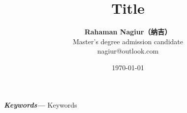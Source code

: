\documentclass[12pt]{article}
\providecommand{\keywords}[1]
{
  \small	
  \textbf{\textit{Keywords---}} #1
}
\begin{document}
\titleformat{\title}[block]{\Large\bfseries}{\thetitle}{1em}{}
\titlespacing*{\title}{60pt}{50pt}{\fill} 

\title{Title\\
\large\textit{}} 

\begin{CJK*}{UTF8}{gbsn}
\author{\textbf{Rahaman Nagiur（纳吉）} \\ Master's degree admission candidate \\ nagiur@outlook.com}
\date{\today}

\maketitle




\keywords{Keywords}











 


\end{CJK*}
\end{document}
